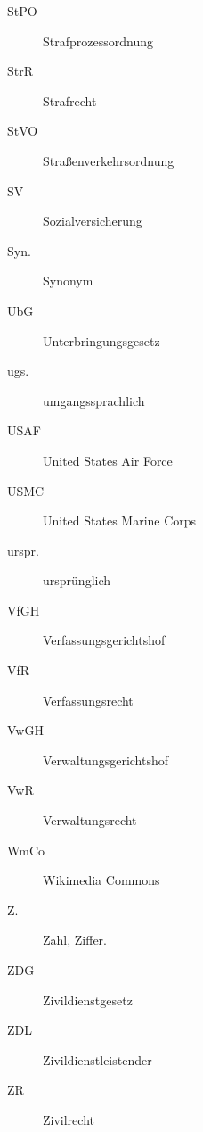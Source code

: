 {\begin{description}
  \item[StPO]   {\dsjuridical} Strafprozessordnung
  \item[StrR]   {\dsjuridical} Strafrecht
  \item[StVO]   {\dsjuridical} Straßenverkehrsordnung
  \item[SV]     Sozialversicherung
  \item[Syn.]   Synonym
  \item[UbG]    {\dsjuridical} Unterbringungsgesetz
  \item[ugs.]   umgangssprachlich
  \item[USAF]   {\dsmilitary} United States Air Force
  \item[USMC]   {\dsmilitary} United States Marine Corps
  \item[urspr.] ursprünglich
  \item[VfGH]   {\dsjuridical} Verfassungsgerichtshof
  \item[VfR]    {\dsjuridical} Verfassungsrecht
  \item[VwGH]   {\dsjuridical} Verwaltungsgerichtshof
  \item[VwR]    {\dsjuridical} Verwaltungsrecht
  \item[WmCo]   Wikimedia Commons
  \item[Z.]     Zahl, Ziffer.
  \item[ZDG]    {\dsjuridical} Zivildienstgesetz
  \item[ZDL]    Zivildienstleistender
  \item[ZR]     Zivilrecht
\end{description}
}
